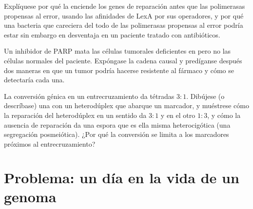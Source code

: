 \begin{exercise}[$\star\star\star$]\label{exo:b3:dna-repair:10}
Explíquese por qué la  enciende los genes de reparación
antes que las polimerasas propensas al error, usando las afinidades de
LexA por sus operadores, y por qué una bacteria que careciera del todo de
las polimerasas propensas al error podría estar sin embargo en desventaja
en un paciente tratado con antibióticos.
\end{exercise}

\begin{exercise}[$\star\star\star$]\label{exo:b3:dna-repair:11}
Un inhibidor de PARP mata las células tumorales deficientes en
\emph{} pero no las células normales del paciente. Expóngase la
cadena causal y predíganse después dos maneras en que un tumor podría
hacerse resistente al fármaco y cómo se detectaría cada una.
\end{exercise}

\begin{exercise}[$\star\star\star$]\label{exo:b3:dna-repair:12}
La conversión génica en un entrecruzamiento da tétradas $3{:}1$. Dibújese
(o descríbase) una  con un heterodúplex que abarque un
marcador, y muéstrese cómo la reparación del heterodúplex en un sentido
da $3{:}1$ y en el otro $1{:}3$, y cómo la ausencia de reparación da una
espora que es ella misma heterocigótica (una segregación posmeiótica).
¿Por qué la conversión se limita a los marcadores próximos al
entrecruzamiento?
\end{exercise}

\section{Problema: un día en la vida de un genoma}

